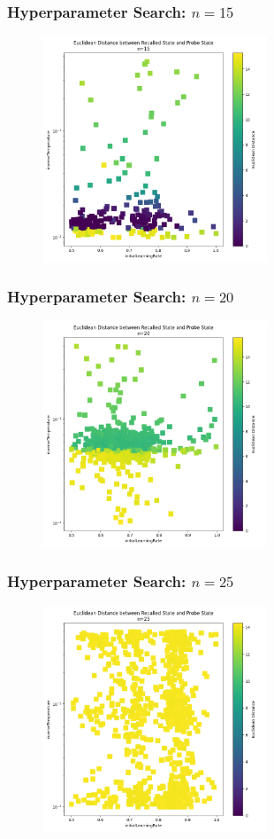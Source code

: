 \begin{frame}
    \frametitle{Hyperparameter Search: \(n=15\)}

    \begin{figure}
        \includegraphics[width=0.6\textwidth]{images/initialHyperparameterSearches/15.png}
    \end{figure}
\end{frame}

\begin{frame}
    \frametitle{Hyperparameter Search: \(n=20\)}

    \begin{figure}
        \includegraphics[width=0.6\textwidth]{images/initialHyperparameterSearches/20.png}
    \end{figure}
\end{frame}

\begin{frame}
    \frametitle{Hyperparameter Search: \(n=25\)}

    \begin{figure}
        \includegraphics[width=0.6\textwidth]{images/initialHyperparameterSearches/25.png}
    \end{figure}
\end{frame}

